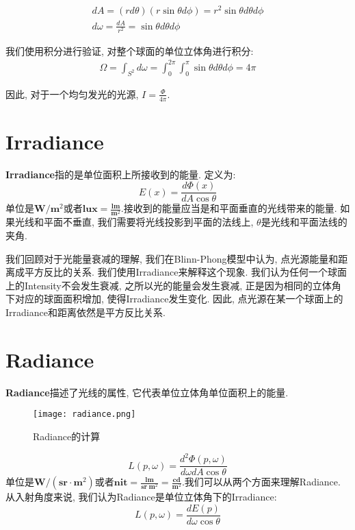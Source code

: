 \begin{equation}
\begin{split}
	dA=(rd\theta)(r\sin \theta d \phi)=r^2\sin\theta d\theta d\phi \\
	d\omega=\frac{dA}{r^2}=\sin\theta d\theta d\phi
\end{split}
\end{equation}

我们使用积分进行验证, 对整个球面的单位立体角进行积分: 
\begin{equation}
	\begin{split}
		\Omega=\int_{S^2}d\omega=\int_{0}^{2\pi}\int_{0}^{\pi}\sin\theta d\theta d\phi = 4\pi
	\end{split}
\end{equation}

因此, 对于一个均匀发光的光源, $I=\frac{\Phi}{4\pi}$. 

\section{Irradiance}

\textbf{Irradiance}指的是单位面积上所接收到的能量. 定义为: 
\begin{equation}
	E(x)=\frac{d\Phi(x)}{dA\cos\theta}
\end{equation} 单位是$\mathbf{W}/\mathbf{m}^2$或者$\mathbf{lux}=\frac{\mathbf{lm}}{\mathbf{m}^2}$.接收到的能量应当是和平面垂直的光线带来的能量. 如果光线和平面不垂直, 我们需要将光线投影到平面的法线上, $\theta$是光线和平面法线的夹角. 

我们回顾对于光能量衰减的理解, 我们在Blinn-Phong模型中认为, 点光源能量和距离成平方反比的关系. 我们使用Irradiance来解释这个现象. 我们认为任何一个球面上的Intensity不会发生衰减, 之所以光的能量会发生衰减, 正是因为相同的立体角下对应的球面面积增加, 使得Irradiance发生变化. 因此, 点光源在某一个球面上的Irradiance和距离依然是平方反比关系. 

\section{Radiance}
\textbf{Radiance}描述了光线的属性, 它代表单位立体角单位面积上的能量. 
\begin{figure}[H]
	\centering
	\texttt{[image: radiance.png]}
	\caption{Radiance的计算}
	\label{fig:radiance}
\end{figure}

\begin{equation}
	L(p,\omega)=\frac{d^2\Phi(p,\omega)}{d\omega dA\cos\theta}
\end{equation} 单位是$\mathbf{W}/(\mathbf{sr}\cdot \mathbf{m}^2)$或者$\mathbf{nit}=\frac{\mathbf{lm}}{\mathbf{sr}\ \mathbf{m}^2}=\frac{\mathbf{cd}}{\mathbf{m}^2}$.我们可以从两个方面来理解Radiance. 从入射角度来说, 我们认为Radiance是单位立体角下的Irradiance: 
\begin{equation}
	L(p,\omega)=\frac{dE(p)}{d\omega \cos\theta}
\end{equation}

